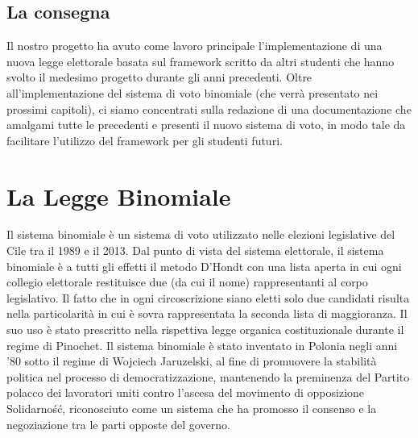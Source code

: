 \documentclass{article}
\begin{document}
\subsection{La consegna}
Il nostro progetto ha avuto come lavoro principale l’implementazione di una nuova legge elettorale basata sul framework scritto da altri studenti che hanno svolto il medesimo progetto durante gli anni precedenti.
Oltre all'implementazione del sistema di voto binomiale (che verrà presentato nei prossimi capitoli), ci siamo concentrati sulla redazione di una documentazione che amalgami tutte le precedenti e presenti il nuovo sistema di voto, in modo tale da facilitare l'utilizzo del framework per gli studenti futuri.

 

\section{La Legge Binomiale}
Il sistema binomiale è un sistema di voto utilizzato nelle elezioni legislative del Cile tra il 1989 e il 2013.\newline
Dal punto di vista del sistema elettorale, il sistema binomiale è a tutti gli effetti il metodo D'Hondt con una lista aperta in cui ogni collegio elettorale restituisce due (da cui il nome) rappresentanti al corpo legislativo. Il fatto che in ogni circoscrizione siano eletti solo due candidati risulta nella particolarità in cui è sovra rappresentata la seconda lista di maggioranza. Il suo uso è stato prescritto nella rispettiva legge organica costituzionale durante il regime di Pinochet.\newline
Il sistema binomiale è stato inventato in Polonia negli anni '80 sotto il regime di Wojciech Jaruzelski, al fine di promuovere la stabilità politica nel processo di democratizzazione, mantenendo la preminenza del Partito polacco dei lavoratori uniti contro l'ascesa del movimento di opposizione Solidarność, riconosciuto come un sistema che ha promosso il consenso e la negoziazione tra le parti opposte del governo.
\end{document}

